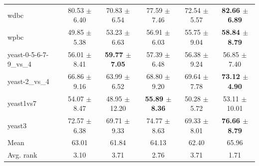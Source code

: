\begin{table}[t]
\begin{tabular}{lccccc}
wdbc & 80.53 $\pm$ 6.40 & 70.83 $\pm$ 6.54 & 77.59 $\pm$ 7.46 & 72.54 $\pm$ 5.57 & \textbf{82.66 $\pm$ 6.89} \\
wpbc & 49.85 $\pm$ 5.38 & 53.23 $\pm$ 6.63 & 56.91 $\pm$ 6.03 & 55.75 $\pm$ 9.04 & \textbf{58.84 $\pm$ 8.79} \\
yeast-0-5-6-7-9\_vs\_4 & 56.01 $\pm$ 8.41 & \textbf{59.77 $\pm$ 7.05} & 57.39 $\pm$ 6.48 & 56.38 $\pm$ 9.24 & 56.85 $\pm$ 7.40 \\
yeast-2\_vs\_4 & 66.86 $\pm$ 9.16 & 63.99 $\pm$ 6.52 & 68.80 $\pm$ 9.20 & 69.64 $\pm$ 7.78 & \textbf{73.12 $\pm$ 4.90} \\
yeast1vs7 & 54.07 $\pm$ 8.47 & 48.95 $\pm$ 12.20 & \textbf{55.89 $\pm$ 8.36} & 50.28 $\pm$ 5.72 & 53.11 $\pm$ 10.01 \\
yeast3 & 72.57 $\pm$ 6.38 & 69.71 $\pm$ 9.33 & 74.77 $\pm$ 8.63 & 69.33 $\pm$ 8.01 & \textbf{76.66 $\pm$ 8.79} \\
\midrule
Mean & 63.01 & 61.84 & 64.13 & 62.40 & 65.96 \\
Avg. rank & 3.10 & 3.71 & 2.76 & 3.71 & 1.71 \\
\bottomrule
\end{tabular}
\end{table}